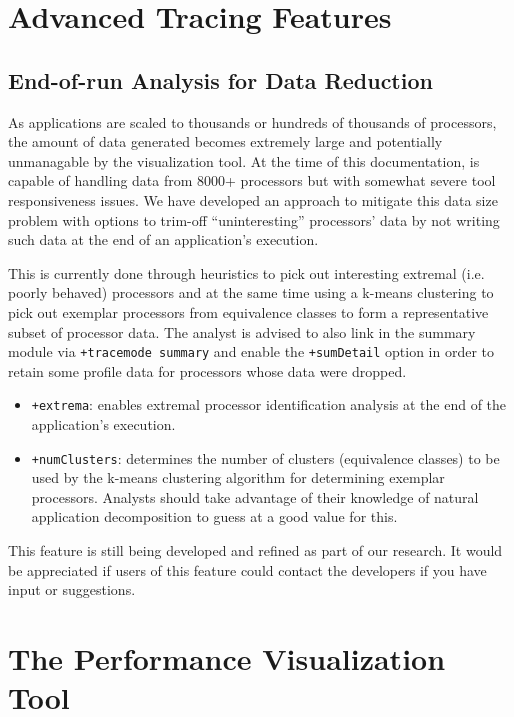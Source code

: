 \documentclass[10pt]{article}
\begin{document}
\section{Advanced Tracing Features}
\label{sec::advanced tracing features}

\subsection{End-of-run Analysis for Data Reduction}
\label{sec::data reduction}

As applications are scaled to thousands or hundreds of thousands of
processors, the amount of data generated becomes extremely large and
potentially unmanagable by the visualization tool. At the time of this
documentation, \projections{} is capable of handling data from 8000+
processors but with somewhat severe tool responsiveness issues. We
have developed an approach to mitigate this data size problem with
options to trim-off ``uninteresting'' processors' data by not writing
such data at the end of an application's execution.

This is currently done through heuristics to pick out interesting
extremal (i.e. poorly behaved) processors and at the same time using a
k-means clustering to pick out exemplar processors from equivalence
classes to form a representative subset of processor data. The analyst
is advised to also link in the summary module via {\tt +tracemode
summary} and enable the {\tt +sumDetail} option in order to retain
some profile data for processors whose data were dropped.

\begin{itemize}
\item
{\tt +extrema}: enables extremal processor identification analysis at
the end of the application's execution.
\item
{\tt +numClusters}: determines the number of clusters (equivalence
classes) to be used by the k-means clustering algorithm for
determining exemplar processors. Analysts should take advantage of
their knowledge of natural application decomposition to guess at a
good value for this.
\end{itemize}

This feature is still being developed and refined as part of our
research. It would be appreciated if users of this feature could
contact the developers if you have input or suggestions.

\newpage

\section{The \projections{} Performance Visualization Tool}
\label{sec::visualization}
\end{document}

